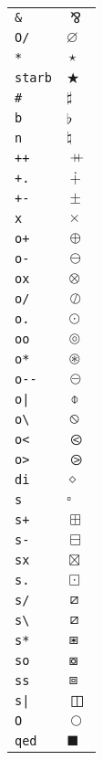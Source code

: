 \begin{longtable}{ll}
\texttt{\&}&${}\bindnasrepma {}$\\
\texttt{O/}&${}\varnothing {}$\\
\texttt{*}&${}\star {}$\\
\texttt{starb}&${}\bigstar {}$\\
\texttt{\#}&${}\sharp {}$\\
\texttt{b}&${}\flat {}$\\
\texttt{n}&${}\natural {}$\\
\texttt{++}&${}\mathbin{{+}\mspace{-8mu}{+}} {}$\\
\texttt{+.}&${}\dotplus {}$\\
\texttt{+{-}}&${}\pm {}$\\
\texttt{x}&${}\times {}$\\
\texttt{o+}&${}\oplus {}$\\
\texttt{o{-}}&${}\ominus {}$\\
\texttt{ox}&${}\otimes {}$\\
\texttt{o/}&${}\oslash {}$\\
\texttt{o.}&${}\odot {}$\\
\texttt{oo}&${}\circledcirc {}$\\
\texttt{o*}&${}\circledast {}$\\
\texttt{o{-}{-}}&${}\circleddash {}$\\
\texttt{o|}&${}\obar {}$\\
\texttt{o\textbackslash }&${}\obslash {}$\\
\texttt{o<}&${}\olessthan {}$\\
\texttt{o>}&${}\ogreaterthan {}$\\
\texttt{di}&${}\diamond {}$\\
\texttt{s}&${}\square {}$\\
\texttt{s+}&${}\boxplus {}$\\
\texttt{s{-}}&${}\boxminus {}$\\
\texttt{sx}&${}\boxtimes {}$\\
\texttt{s.}&${}\boxdot {}$\\
\texttt{s/}&${}\boxslash {}$\\
\texttt{s\textbackslash }&${}\boxslash {}$\\
\texttt{s*}&${}\boxast {}$\\
\texttt{so}&${}\boxcircle {}$\\
\texttt{ss}&${}\boxbox {}$\\
\texttt{s|}&${}\boxbar {}$\\
\texttt{O}&${}\bigcirc {}$\\
\texttt{qed}&${}\blacksquare {}$\\

\end{longtable}
